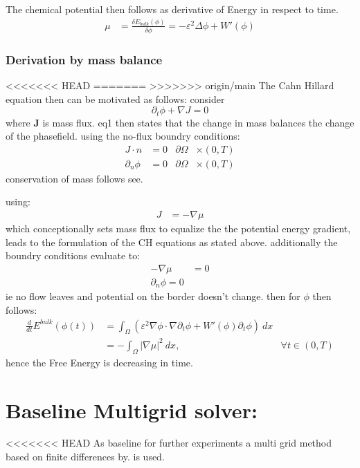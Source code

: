\documentclass[11pt]{article}
\begin{document}
The chemical potential then follows as derivative of Energy in respect to time.
\begin{align*}
 \mu &= \frac{\delta E_{bulk}(\phi)}{\delta \phi } = -\varepsilon^2 \Delta \phi  + W'(\phi)
\end{align*}
\subsubsection{Derivation by mass balance}
<<<<<<< HEAD
\label{sec:org0c2e61c}
=======
\label{sec:orgaadf4c8}
>>>>>>> origin/main
The Cahn Hillard equation then can be motivated as follows:
consider
\begin{equation}
    \partial_t \phi + \nabla J  = 0
\end{equation}
where   \textbf{J} is mass flux. eq1 then states that the change in mass balances the change of the phasefield.
using the no-flux boundry conditions:
\begin{align}
J \cdot n &= 0  & \partial\Omega &\times (0,T)\\
\partial_n\phi  &= 0  & \partial\Omega &\times (0,T)
\end{align}
conservation of mass follows see\autocite{Wu_2022}.

using:
\begin{align}
J &= - \nabla \mu
\end{align}
which conceptionally sets mass flux to equalize the  the potential energy gradient, leads to the formulation of the CH equations as stated above. additionally the boundry conditions evaluate to:
\begin{align*}
 - \nabla \mu &= 0 \\
\partial_n \phi  = 0
\end{align*}
ie no flow leaves and potential on the border doesn't change.
then for \(\phi\) then follows:
\begin{align*}
\frac{d}{dt}E^{bulk}(\phi(t)) &= \int_{\Omega} (\varepsilon^2 \nabla \phi \cdot \nabla \partial_t \phi + W'(\phi) \partial_t \phi) \ d x  \\
&= - \int_{  \Omega } |\nabla \mu|^2 \ d x, & \forall t \in  (0,T)
\end{align*}
hence the Free Energy is decreasing in time.
\section{Baseline Multigrid solver:}
<<<<<<< HEAD
\label{sec:orgda878d7}
As baseline for further experiments a multi grid method based on finite differences by\autocite{SHIN20117441}. is used.
\end{document}
